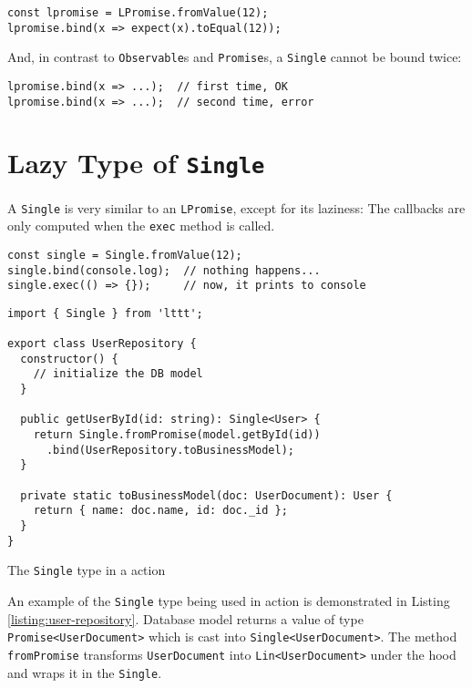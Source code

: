\begin{verbatim}
const lpromise = LPromise.fromValue(12);
lpromise.bind(x => expect(x).toEqual(12));
\end{verbatim}

And, in contrast to \texttt{Observable}s and \texttt{Promise}s, a \texttt{Single} cannot be bound twice:

\begin{verbatim}
lpromise.bind(x => ...);  // first time, OK
lpromise.bind(x => ...);  // second time, error
\end{verbatim}

\section{Lazy Type of \texttt{Single}}

A \texttt{Single} is very similar to an \texttt{LPromise}, except for its laziness: The callbacks are only computed when the \texttt{exec} method is called.

\begin{verbatim}
const single = Single.fromValue(12);
single.bind(console.log);  // nothing happens...
single.exec(() => {});     // now, it prints to console
\end{verbatim}


\begin{listing}[t]
\begin{verbatim}
import { Single } from 'lttt';

export class UserRepository {
  constructor() {
    // initialize the DB model
  }
  
  public getUserById(id: string): Single<User> {
    return Single.fromPromise(model.getById(id))
      .bind(UserRepository.toBusinessModel);
  }
  
  private static toBusinessModel(doc: UserDocument): User {
    return { name: doc.name, id: doc._id };
  }
}
\end{verbatim}
\caption{The \texttt{Single} type in a action}
\label{listing:user-repository}
\end{listing}

An example of the \texttt{Single} type being used in action is demonstrated in Listing \ref{listing:user-repository}. Database model returns a value of type \texttt{Promise<UserDocument>} which is cast into \texttt{Single<UserDocument>}. The method \texttt{fromPromise} transforms \texttt{UserDocument} into \texttt{Lin<UserDocument>} under the hood and wraps it in the \texttt{Single}.

